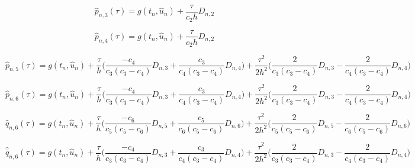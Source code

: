 \documentclass[12pt]{article}
\begin{document}
\begin{equation}
\hat{p}_{n,3}(\tau) = g(t_n,\hat{u}_n) + \frac{\tau}{c_2h}D_{n,2}
\end{equation}

\begin{equation}
\hat{p}_{n,4}(\tau) = g(t_n,\hat{u}_n) + \frac{\tau}{c_2h}D_{n,2}
\end{equation}

\begin{equation}
\hat{p}_{n,5}(\tau) = g(t_n,\hat{u}_n) + \frac{\tau}{h}\Bigg(\frac{-c_4}{c_3(c_3 - c_4)}D_{n,3} + \frac{c_3}{c_4(c_3 - c_4)}D_{n,4} \Bigg) + \frac{\tau^2}{2h^2}\Bigg(\frac{2}{c_3(c_3-c_4)}D_{n,3} - \frac{2}{c_4(c_3 - c_4)}D_{n,4} \Bigg)
\end{equation}

\begin{equation}
\hat{p}_{n,6}(\tau) = g(t_n,\hat{u}_n) + \frac{\tau}{h}\Bigg(\frac{-c_4}{c_3(c_3 - c_4)}D_{n,3} + \frac{c_3}{c_4(c_3 - c_4)}D_{n,4} \Bigg) + \frac{\tau^2}{2h^2}\Bigg(\frac{2}{c_3(c_3-c_4)}D_{n,3} - \frac{2}{c_4(c_3 - c_4)}D_{n,4} \Bigg)
\end{equation}

\begin{equation}
\hat{q}_{n,6}(\tau) = g(t_n,\hat{u}_n) + \frac{\tau}{h}\Bigg(\frac{-c_6}{c_5(c_5 - c_6)}D_{n,5} + \frac{c_5}{c_6(c_5 - c_6)}D_{n,6} \Bigg) + \frac{\tau^2}{2h^2}\Bigg(\frac{2}{c_5(c_5-c_6)}D_{n,5} - \frac{2}{c_6(c_5 - c_6)}D_{n,6} \Bigg)
\end{equation}

\begin{equation}
\hat{\bar{q}}_{n,6}(\tau) = g(t_n,\hat{u}_n) + \frac{\tau}{h}\Bigg(\frac{-c_4}{c_3(c_3 - c_4)}D_{n,3} + \frac{c_3}{c_4(c_3 - c_4)}D_{n,4} \Bigg) + \frac{\tau^2}{2h^2}\Bigg(\frac{2}{c_3(c_3-c_4)}D_{n,3} - \frac{2}{c_4(c_3 - c_4)}D_{n,4} \Bigg)
\end{equation}
\end{document}
